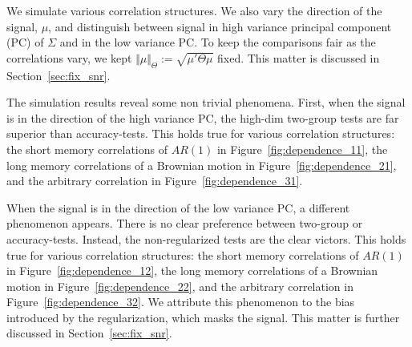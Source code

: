 \documentclass[]{bio}
\begin{document}
We simulate various correlation structures.
We also vary the direction of the signal, $\mu$, and distinguish between signal in high variance principal component (PC) of $\Sigma$ and in the low variance PC. 
To keep the comparisons fair as the correlations vary, we kept $\Vert \mu \Vert_\Theta:=\sqrt{\mu'\Theta\mu}$ fixed.
This matter is discussed in Section~\ref{sec:fix_snr}.


The simulation results reveal some non trivial phenomena.
First, when the signal is in the direction of the high variance PC, the high-dim two-group tests are far superior than accuracy-tests. 
This holds true for various correlation structures: the short memory correlations of $AR(1)$ in Figure~\ref{fig:dependence_11}, the long memory correlations of a Brownian motion in Figure~\ref{fig:dependence_21}, and the arbitrary correlation in Figure~\ref{fig:dependence_31}.

When the signal is in the direction of the low variance PC, a different phenomenon appears.
There is no clear preference between two-group or accuracy-tests.
Instead, the non-regularized tests are the clear victors. 
This holds true for various correlation structures: the short memory correlations of $AR(1)$ in Figure~\ref{fig:dependence_12}, the long memory correlations of a Brownian motion in Figure~\ref{fig:dependence_22}, and the arbitrary correlation in Figure~\ref{fig:dependence_32}.
We attribute this phenomenon to the bias introduced by the regularization, which masks the signal.
This matter is further discussed in Section~\ref{sec:fix_snr}.
\end{document}
